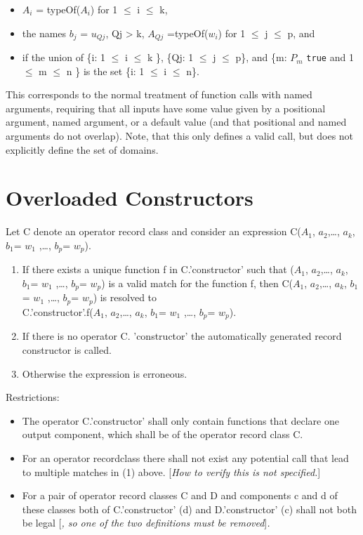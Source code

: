 \begin{itemize}
\item
  $A_{i}$ = typeOf($A_{i}$) for 1 $\le$ i $\le$ k,
\item
  the names $b_{j}$ = $u_{Qj}$, Qj \textgreater{}
  k, $A_{Qj}$ =typeOf($w_{i}$) for 1 $\le$ j $\le$ p, and
\item
  if the union of \{i: 1 $\le$ i $\le$ k \}, \{Qj: 1 $\le$ j $\le$ p\}, and \{m:
  $P_{m}$ \lstinline!true! and 1 $\le$ m $\le$ n \} is the set \{i: 1 $\le$
  i $\le$ n\}.
\end{itemize}

\begin{nonnormative}
This corresponds to the normal treatment of function calls with
named arguments, requiring that all inputs have some value given by a
positional argument, named argument, or a default value (and that
positional and named arguments do not overlap). Note, that this only
defines a valid call, but does not explicitly define the set of
domains.
\end{nonnormative}

\section{Overloaded Constructors}

Let C denote an operator record class and consider an expression
C($A_1$, $a_{2}$,\ldots{}, $a_{k}$,
$b_{1}$= $w_{1}$ ,\ldots{}, $b_{p}$=
$w_{p}$).

\begin{enumerate}
\item
  If there exists a {unique} function f in C.'constructor' such that
  ($A_1$, $a_{2}$,\ldots{}, $a_{k}$,
  $b_{1}$= $w_{1}$ ,\ldots{}, $b_{p}$=
  $w_{p}$) is a valid match for the function f, then
  C($A_1$, $a_{2}$,\ldots{}, $a_{k}$,
  $b_{1}$= $w_{1}$ ,\ldots{}, $b_{p}$=
  $w_{p}$) is resolved to\\
  C.'constructor'.f($A_1$, $a_{2}$,\ldots{},
  $a_{k}$, $b_{1}$= $w_{1}$ ,\ldots{},
  $b_{p}$= $w_{p}$).
\item
  If there is no operator C. 'constructor' the automatically generated
  record constructor is called.
\item
  Otherwise the expression is erroneous.
\end{enumerate}

Restrictions:

\begin{itemize}
\item
  The operator C.'constructor' shall only contain functions that declare
  one output component, which shall be of the operator record class C.
\item
  For an operator recordclass there shall not exist any potential call
  that lead to multiple matches in (1) above. {[}\emph{How to verify
  this is not specified.}{]}
\item
  For a pair of operator record classes C and D and components c and d
  of these classes both of C.'constructor' (d) and D.'constructor' (c)
  shall not both be legal {[}\emph{, so one of the two definitions must
  be removed}{]}\emph{.}
\end{itemize}

